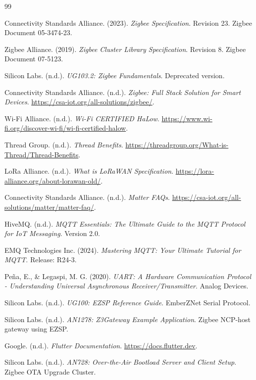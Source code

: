 
\clearpage
{}
{}
\renewcommand{\bibname}{TÀI LIỆU THAM KHẢO}

\begin{thebibliography}{99}

Connectivity Standards Alliance. (2023). \textit{Zigbee Specification}. Revision 23. Zigbee Document 05-3474-23.

Zigbee Alliance. (2019). \textit{Zigbee Cluster Library Specification}. Revision 8. Zigbee Document 07-5123.

Silicon Labs. (n.d.). \textit{UG103.2: Zigbee Fundamentals}. Deprecated version.

Connectivity Standards Alliance. (n.d.). \textit{Zigbee: Full Stack Solution for Smart Devices}. \url{https://csa-iot.org/all-solutions/zigbee/}.

Wi-Fi Alliance. (n.d.). \textit{Wi-Fi CERTIFIED HaLow}. \url{https://www.wi-fi.org/discover-wi-fi/wi-fi-certified-halow}.

Thread Group. (n.d.). \textit{Thread Benefits}. \url{https://threadgroup.org/What-is-Thread/Thread-Benefits}.

LoRa Alliance. (n.d.). \textit{What is LoRaWAN Specification}. \url{https://lora-alliance.org/about-lorawan-old/}.

Connectivity Standards Alliance. (n.d.). \textit{Matter FAQs}. \url{https://csa-iot.org/all-solutions/matter/matter-faq/}.

HiveMQ. (n.d.). \textit{MQTT Essentials: The Ultimate Guide to the MQTT Protocol for IoT Messaging}. Version 2.0.

EMQ Technologies Inc. (2024). \textit{Mastering MQTT: Your Ultimate Tutorial for MQTT}. Release: R24-3.

Peña, E., \& Legaspi, M. G. (2020). \textit{UART: A Hardware Communication Protocol - Understanding Universal Asynchronous Receiver/Transmitter}. Analog Devices.

Silicon Labs. (n.d.). \textit{UG100: EZSP Reference Guide}. EmberZNet Serial Protocol.

Silicon Labs. (n.d.). \textit{AN1278: Z3Gateway Example Application}. Zigbee NCP-host gateway using EZSP.

Google. (n.d.). \textit{Flutter Documentation}. \url{https://docs.flutter.dev}.

Silicon Labs. (n.d.). \textit{AN728: Over-the-Air Bootload Server and Client Setup}. Zigbee OTA Upgrade Cluster.

\end{thebibliography}
